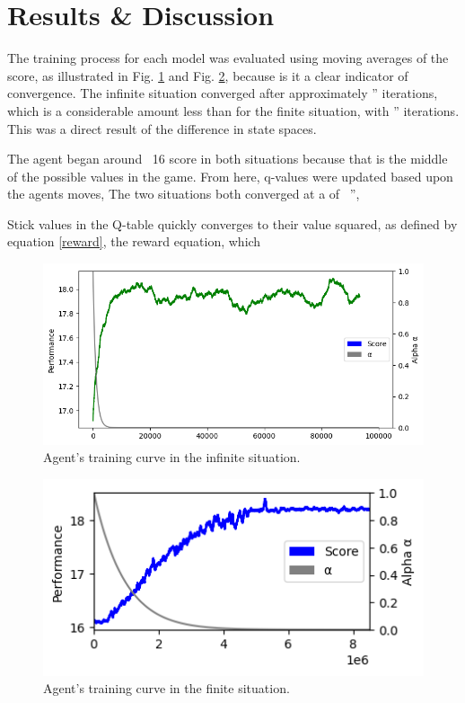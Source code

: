 \section{Results \& Discussion}

The training process for each model was evaluated using moving averages of the score, as illustrated in Fig. \ref{fig: Training curve - Infinite} and Fig. \ref{fig: Training curve - Finite}, because is it a clear indicator of convergence. The infinite situation converged after approximately '' iterations, which is a considerable amount less than for the finite situation, with '' iterations. This was a direct result of the difference in state spaces. 

The agent began around ~16 score in both situations because that is the middle of the possible values in the game. From here, q-values were updated based upon the agents moves, 
The two situations both converged at a  of  ~'', 

Stick values in the Q-table quickly converges to their value squared, as defined by equation \ref{reward}, the reward equation, which 

\begin{figure}[ht] 
    \centering
    \includegraphics[width=\singlefigure]{figures/infinite_training_curve.png}
    \caption{Agent's training curve in the infinite situation.}
    \label{fig: Training curve - Infinite} 
\end{figure}

\begin{figure}[ht] 
    \centering
    \includegraphics[width=\singlefigure]{figures/finite_training_curve.png}
    \caption{Agent's training curve in the finite situation.}
    \label{fig: Training curve - Finite} 
\end{figure}


